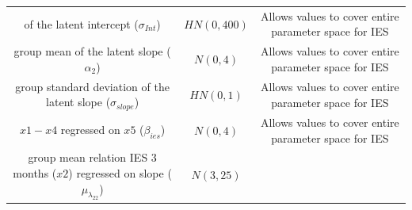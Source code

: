 \documentclass[openright,titlepage,12pt,a4paper]{book}
\begin{document}
\begin{longtable}[]{@{}ccc@{}}
\begin{minipage}[t]{0.29\columnwidth}
of the latent intercept
(\(\sigma_{Int}\))\strut
\end{minipage} & \begin{minipage}[t]{0.16\columnwidth}\centering
\(HN(0, 400)\)\strut
\end{minipage} & \begin{minipage}[t]{0.45\columnwidth}\centering
Allows values to cover entire
parameter space for IES\strut
\end{minipage}\tabularnewline
\begin{minipage}[t]{0.29\columnwidth}\centering
group mean of the latent
slope (\(\alpha_2\))\strut
\end{minipage} & \begin{minipage}[t]{0.16\columnwidth}\centering
\(N(0, 4)\)\strut
\end{minipage} & \begin{minipage}[t]{0.45\columnwidth}\centering
Allows values to cover entire
parameter space for IES\strut
\end{minipage}\tabularnewline
\begin{minipage}[t]{0.29\columnwidth}\centering
group standard deviation
of the latent slope
(\(\sigma_{slope}\))\strut
\end{minipage} & \begin{minipage}[t]{0.16\columnwidth}\centering
\(HN(0, 1)\)\strut
\end{minipage} & \begin{minipage}[t]{0.45\columnwidth}\centering
Allows values to cover entire
parameter space for IES\strut
\end{minipage}\tabularnewline
\begin{minipage}[t]{0.29\columnwidth}\centering
\(x1-x4\) regressed on
\(x5\) (\(\beta_{ies}\))\strut
\end{minipage} & \begin{minipage}[t]{0.16\columnwidth}\centering
\(N(0, 4)\)\strut
\end{minipage} & \begin{minipage}[t]{0.45\columnwidth}\centering
Allows values to cover entire
parameter space for IES\strut
\end{minipage}\tabularnewline
\begin{minipage}[t]{0.29\columnwidth}\centering
group mean relation IES
3 months (\(x2\)) regressed
on slope
(\(\mu_{\lambda_{22}}\))\strut
\end{minipage} & \begin{minipage}[t]{0.16\columnwidth}\centering
\(N(3, 25)\)\strut
\end{minipage} & \begin{minipage}[t]{0.45\columnwidth}\centering

\end{minipage}
\end{longtable}
\end{document}
